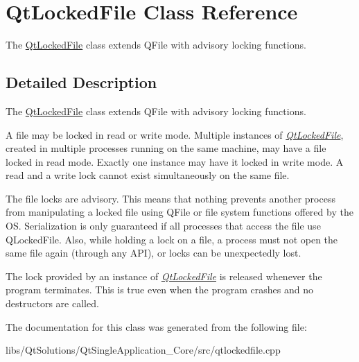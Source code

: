 \hypertarget{class_qt_locked_file}{}\section{Qt\+Locked\+File Class Reference}
\label{class_qt_locked_file}


The \hyperlink{class_qt_locked_file}{Qt\+Locked\+File} class extends Q\+File with advisory locking functions.  




\subsection{Detailed Description}
The \hyperlink{class_qt_locked_file}{Qt\+Locked\+File} class extends Q\+File with advisory locking functions. 

A file may be locked in read or write mode. Multiple instances of {\itshape \hyperlink{class_qt_locked_file}{Qt\+Locked\+File}}, created in multiple processes running on the same machine, may have a file locked in read mode. Exactly one instance may have it locked in write mode. A read and a write lock cannot exist simultaneously on the same file.

The file locks are advisory. This means that nothing prevents another process from manipulating a locked file using Q\+File or file system functions offered by the OS. Serialization is only guaranteed if all processes that access the file use Q\+Locked\+File. Also, while holding a lock on a file, a process must not open the same file again (through any A\+PI), or locks can be unexpectedly lost.

The lock provided by an instance of {\itshape \hyperlink{class_qt_locked_file}{Qt\+Locked\+File}} is released whenever the program terminates. This is true even when the program crashes and no destructors are called. 

The documentation for this class was generated from the following file\+:\begin{DoxyCompactItemize}
\item 
libs/\+Qt\+Solutions/\+Qt\+Single\+Application\+\_\+\+Core/src/qtlockedfile.\+cpp\end{DoxyCompactItemize}
